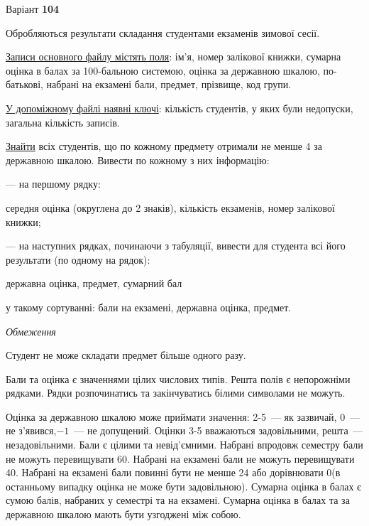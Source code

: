 \documentclass[11pt, ukrainian]{article}
\begin{document}
\par
\newpage
{\center Варіант  \No \textbf { 104 }\par}
\bigskip
Обробляються результати складання студентами екзаменів зимової сесії.

\underline{Записи основного файлу містять поля}: ім’я, номер залікової книжки, сумарна оцінка в балах за 100-бальною системою, оцінка за державною шкалою, по-батькові, набрані на екзамені бали, предмет, прізвище, код групи.

\underline{У допоміжному файлі наявні ключі}: кількість студентів, у яких були недопуски, загальна кількість записів.

\underline{Знайти} всіх студентів, що по кожному предмету отримали не менше 4 за державною шкалою. Вивести по кожному з них інформацію:\par
{\noindent}--- на першому рядку:\par
середня оцінка (округлена до 2 знаків), кількість екзаменів, номер залікової книжки;

{\noindent}--- на наступних рядках, починаючи з табуляції, вивести для студента всі його результати (по одному на рядок):\par
державна оцінка, предмет, сумарний бал

{\noindent}у такому сортуванні: бали на екзамені, державна оцінка, предмет.


\bigskip\textit{Обмеження}

Студент не може складати предмет більше одного разу.

Бали та оцінка є значеннями цілих числових типів. Решта полів є непорожніми рядками.
Рядки розпочинатись та закінчуватись білими символами не можуть.

Оцінка за державною шкалою може приймати значення: 2-5~--- як зазвичай, 0~--- не з’явився,$-1$~--- не допущений. 
Оцінки 3-5 вважаються задовільними, решта~--- незадовільними. 
Бали є цілими та невід’ємними.
Набрані впродовж семестру бали не можуть перевищувати 60. 
Набрані на екзамені бали не можуть перевищувати 40. 
Набрані на екзамені бали повинні бути не менше 24 або дорівнювати 0(в останньому випадку оцінка не може бути задовільною). 
Сумарна оцінка в балах є сумою балів, набраних у семестрі та на екзамені.
Сумарна оцінка в балах та за державною шкалою мають бути узгоджені між собою.
\end{document}
